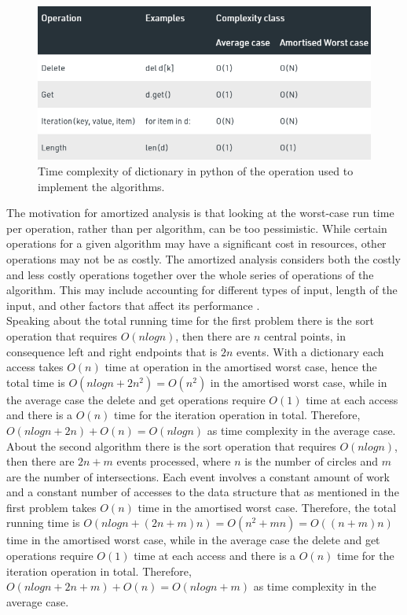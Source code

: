\documentclass[12pt]{article}
\begin{document}
\begin{figure}[H]
	\centering
	\includegraphics[scale=0.4]{img/2.png}
	\caption{Time complexity of dictionary in python of the operation used to implement the algorithms.} \label{fig:1b}
\end{figure}
\noindent The motivation for amortized analysis is that looking at the worst-case run time per operation, rather than per algorithm, can be too pessimistic. While certain operations for a given algorithm may have a significant cost in resources, other operations may not be as costly. The amortized analysis considers both the costly and less costly operations together over the whole series of operations of the algorithm. This may include accounting for different types of input, length of the input, and other factors that affect its performance \cite{wiki:xxx}. \\

\noindent Speaking about the total running time for the first problem there is the sort operation that requires $O(nlogn)$, then there are $n$ central points, in consequence left and right endpoints that is $2n$ events. With a dictionary each access takes $O(n)$ time at operation in the amortised worst case, hence the total time is $O(nlogn + 2n^2) = O(n^2)$ in the amortised worst case, while in the average case the delete and get operations require $O(1)$ time at each access and there is a $O(n)$ time for the iteration operation in total. Therefore, $O(nlogn + 2n)+O(n) = O(nlogn)$ as time complexity in the average case. \\

\noindent About the second algorithm there is the sort operation that requires $O(nlogn)$, then there are $2n + m$ events processed, where $n$ is the number of circles and $m$ are the number of intersections. Each event involves a constant amount of work and a constant number of accesses to the data structure that as mentioned in the first problem takes $O(n)$ time in the amortised worst case. Therefore, the total running time is $O(nlogn + (2n + m) n) = O(n^2 + mn) = O((n + m)n)$ time in the amortised worst case, while in the average case the delete and get operations require $O(1)$ time at each access and there is a $O(n)$ time for the iteration operation in total. Therefore, $O(nlogn + 2n+m)+O(n) = O(nlogn+m)$ as time complexity in the average case.
\end{document}

